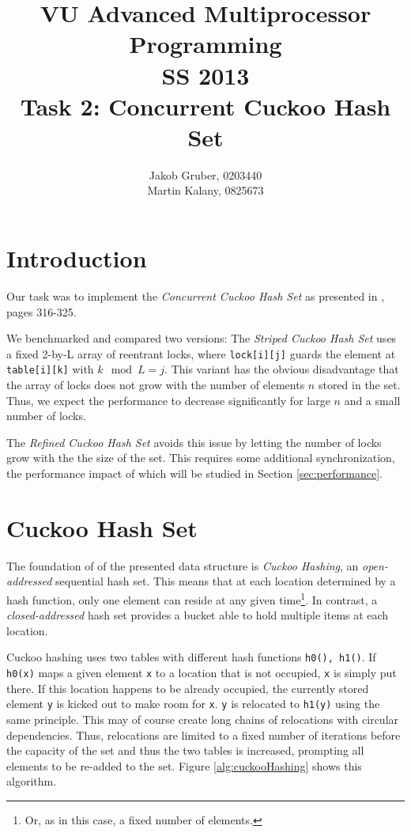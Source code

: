 \documentclass[a4paper,10pt]{article}
\title{VU Advanced Multiprocessor Programming \\
       SS 2013 \\
       Task 2: Concurrent Cuckoo Hash Set}
\author{Jakob Gruber, 0203440 \\
        Martin Kalany, 0825673}
\begin{document}
\maketitle

\section{Introduction}

Our task was to implement the \emph{Concurrent Cuckoo Hash Set} as presented
in \cite{herlihy}, pages 316-325. 

We benchmarked and compared two versions: The \emph{Striped Cuckoo Hash Set}
uses a fixed 2-by-L array of reentrant locks, where \lstinline|lock[i][j]|
guards the element at \lstinline|table[i][k]| with $k \mod L = j$. This variant
has the obvious disadvantage that the array of locks does not grow with the
number of elements $n$ stored in the set. Thus, we expect the performance to
decrease significantly for large $n$ and a small number of locks.

The \emph{Refined Cuckoo Hash Set} avoids this issue by letting the number of
locks grow with the the size of the set. This requires some additional
synchronization, the performance impact of which will be studied in Section
\ref{sec:performance}.

\section{Cuckoo Hash Set}

The foundation of of the presented data structure is \emph{Cuckoo Hashing},
an \textit{open-addressed} sequential hash set. This means that at each
location determined by a hash function, only one element can reside at any
given time\footnote{Or, as in this case, a fixed number of elements.}. In
contrast, a \emph{closed-addressed} hash set provides a bucket able to hold
multiple items at each location.

Cuckoo hashing uses two tables with different hash functions
\lstinline|h0(), h1()|. If \lstinline|h0(x)| maps a given element \lstinline|x|
to a location that is not occupied, \lstinline|x| is simply put there. If this
location happens to be already occupied, the currently stored element
\lstinline|y| is kicked out to make room for \lstinline|x|. \lstinline|y| is
relocated to \lstinline|h1(y)| using the same principle. This may of course
create long chains of relocations with circular dependencies. Thus, relocations
are limited to a fixed number of iterations before the capacity of the set and
thus the two tables is increased, prompting all elements to be re-added to the
set.  Figure \ref{alg:cuckooHashing} shows this algorithm.
\end{document}
